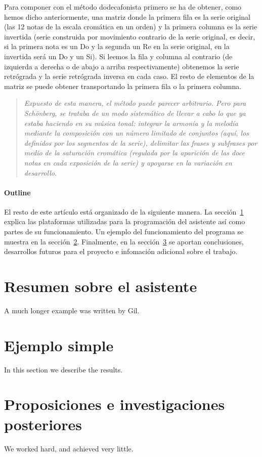 \documentclass[12pt]{article}
\begin{document}
Para componer con el método dodecafonista primero se ha de obtener, como hemos dicho anteriormente, una matriz donde la primera fila es la serie original (las 12 notas de la escala cromática en un orden) y la primera columna es la serie invertida (serie construida por movimiento contrario de la serie original, es decir, si la primera nota es un Do y la segunda un Re en la serie original, en la invertida será un Do y un Si). Si leemos la fila y columna al contrario (de izquierda a derecha o de abajo a arriba respectivamente) obtenemos la serie retrógrada y la serie retrógrada inversa en cada caso. El resto de elementos de la matriz se puede obtener transportando la primera fila o la primera columna.

\begin{quote}
\em Expuesto de esta manera, el método puede parecer arbitrario. Pero para Schönberg, se trataba de un modo sistemático de llevar a cabo lo que ya estaba haciendo en su música tonal: integrar la armonía y la melodía mediante la composición con un número limitado de conjuntos (aquí, los definidos por los segmentos de la serie), delimitar las frases y subfrases por medio de la saturación cromática (regulada por la aparición de las doce notas en cada exposición de la serie) y apoyarse en la variación en desarrollo. \cite{palisca}
\end{quote}

\paragraph{Outline}
El resto de este artículo está organizado de la siguiente manera. La sección~\ref{overview} explica las plataformas utilizadas para la programación del asistente así como partes de su funcionamiento.
Un ejemplo del funcionamiento del programa se muestra en la sección~\ref{example}.
Finalmente, en la sección~\ref{conclusions} se aportan conclusiones, desarrollos futuros para el proyecto e infomación adicional sobre el trabajo.

\section{Resumen sobre el asistente}\label{overview}
A much longer \LaTeXe{} example was written by Gil.

\section{Ejemplo simple}\label{example}
In this section we describe the results.

\section{Proposiciones e investigaciones posteriores}\label{conclusions}
We worked hard, and achieved very little.



\end{document}
